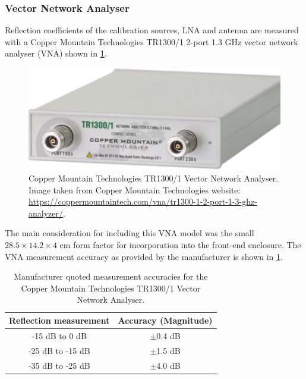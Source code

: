 \subsubsection{Vector Network Analyser}
Reflection coefficients of the calibration sources, LNA and antenna are measured with a Copper Mountain Technologies TR1300/1 2-port 1.3 GHz vector network analyser (VNA) shown in \cref{fig:vna}.
\begin{figure}
    \centering
    \includegraphics[scale=0.5]{vna}
    \caption{Copper Mountain Technologies TR1300/1 Vector Network Analyser. Image taken from Copper Mountain Technologies website: \url{https://coppermountaintech.com/vna/tr1300-1-2-port-1-3-ghz-analyzer/}.}
    \label{fig:vna}
\end{figure}
The main consideration for including this VNA model was the small $28.5 \times 14.2 \times 4$ cm form factor for incorporation into the front-end enclosure. The VNA measurement accuracy as provided by the manufacturer is shown in \cref{tab:vna_acc}.
\begin{table}
    \begin{center}
    \begin{tabular}{ |c|c| }
    \hline
    Reflection measurement & Accuracy (Magnitude) \\
    \hline
    -15 dB to 0 dB & $\pm$0.4 dB \\
    -25 dB to -15 dB & $\pm$1.5 dB \\
    -35 dB to -25 dB & $\pm$4.0 dB \\
    \hline
    \end{tabular}
    \caption{Manufacturer quoted measurement accuracies for the Copper Mountain Technologies TR1300/1 Vector Network Analyser.}
    \label{tab:vna_acc}
    \end{center}
\end{table}

